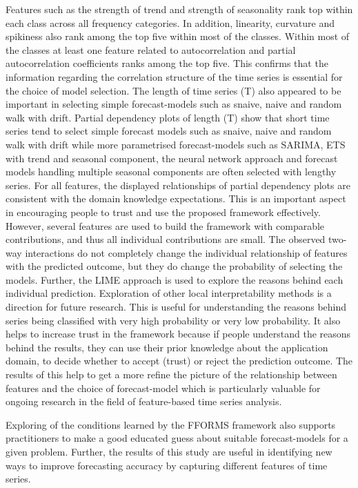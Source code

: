 \documentclass[11pt,a4paper,]{article}
\begin{document}
Features such as the strength of trend and strength of seasonality rank top within each class across all frequency categories. In addition, linearity, curvature and spikiness also rank among the top five within most of the classes. Within most of the classes at least one feature related to autocorrelation and partial autocorrelation coefficients ranks among the top five. This confirms that the information regarding the correlation structure of the time series is essential for the choice of model selection. The length of time series (T) also appeared to be important in selecting simple forecast-models such as snaive, naive and random walk with drift. Partial dependency plots of length (T) show that short time series tend to select simple forecast models such as snaive, naive and random walk with drift while more parametrised forecast-models such as SARIMA, ETS with trend and seasonal component, the neural network approach and forecast models handling multiple seasonal components are often selected with lengthy series. For all features, the displayed relationships of partial dependency plots are consistent with the domain knowledge expectations. This is an important aspect in encouraging people to trust and use the proposed framework effectively. However, several features are used to build the framework with comparable contributions, and thus all individual contributions are small. The observed two-way interactions do not completely change the individual relationship of features with the predicted outcome, but they do change the probability of selecting the models. Further, the LIME approach is used to explore the reasons behind each individual prediction. Exploration of other local interpretability methods is a direction for future research. This is useful for understanding the reasons behind series being classified with very high probability or very low probability. It also helps to increase trust in the framework because if people understand the reasons behind the results, they can use their prior knowledge about the application domain, to decide whether to accept (trust) or reject the prediction outcome. The results of this help to get a more refine the picture of the relationship between features and the choice of forecast-model which is particularly valuable for ongoing research in the field of feature-based time series analysis.

Exploring of the conditions learned by the FFORMS framework also supports practitioners to make a good educated guess about suitable forecast-models for a given problem. Further, the results of this study are useful in identifying new ways to improve forecasting accuracy by capturing different features of time series.
\end{document}

